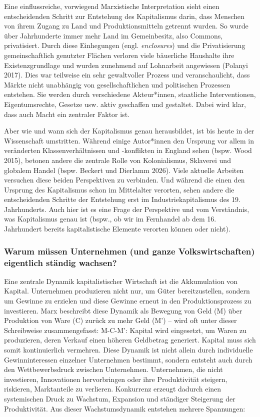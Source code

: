 \documentclass[
  nswissgerman,
  a4paper,
  DIV=11,
  numbers=noendperiod,
  oneside,
  openany]{scrreprt}
\begin{document}
Eine einflussreiche, vorwiegend Marxistische Interpretation sieht einen
entscheidenden Schritt zur Entstehung des Kapitalismus darin, dass
Menschen von ihrem Zugang zu Land und Produktionsmitteln getrennt
wurden. So wurde über Jahrhunderte immer mehr Land im Gemeinbesitz, also
Commons, privatisiert. Durch diese Einhegungen (engl. \emph{enclosures})
und die Privatisierung gemeinschaftlich genutzter Flächen verloren viele
bäuerliche Haushalte ihre Existenzgrundlage und wurden zunehmend auf
Lohnarbeit angewiesen (Polanyi 2017). Dies war teilweise ein sehr
gewaltvoller Prozess und veranschaulicht, dass Märkte nicht unabhängig
von gesellschaftlichen und politischen Prozessen entstehen. Sie werden
durch verschiedene Akteur*innen, staatliche Interventionen,
Eigentumsrechte, Gesetze usw. aktiv geschaffen und gestaltet. Dabei wird
klar, dass auch Macht ein zentraler Faktor ist.

Aber wie und wann sich der Kapitalismus genau herausbildet, ist bis
heute in der Wissenschaft umstritten. Während einige Autor*innen den
Ursprung vor allem in veränderten Klassenverhältnissen und -konflikten
in England sehen (bspw. Wood 2015), betonen andere die zentrale Rolle
von Kolonialismus, Sklaverei und globalem Handel (bspw. Beckert und
Dierlamm 2026). Viele aktuelle Arbeiten versuchen diese beiden
Perspektiven zu verbinden. Und während die einen den Ursprung des
Kapitalismus schon im Mittelalter verorten, sehen andere die
entscheidenden Schritte der Entstehung erst im Industriekapitalismus des
19. Jahrhunderts. Auch hier ist es eine Frage der Perspektive und vom
Verständnis, was Kapitalismus genau ist (bspw., ob wir im Fernhandel ab
dem 16. Jahrhundert bereits kapitalistische Elemente verorten können
oder nicht).

\subsubsection{Warum müssen Unternehmen (und ganze Volkswirtschaften)
eigentlich ständig
wachsen?}\label{warum-muxfcssen-unternehmen-und-ganze-volkswirtschaften-eigentlich-stuxe4ndig-wachsen}

Eine zentrale Dynamik kapitalistischer Wirtschaft ist die Akkumulation
von Kapital. Unternehmen produzieren nicht nur, um Güter
bereitzustellen, sondern um Gewinne zu erzielen und diese Gewinne erneut
in den Produktionsprozess zu investieren. Marx beschreibt diese Dynamik
als Bewegung von Geld (M) über Produktion von Ware (C) zurück zu mehr
Geld (M') -- wird oft unter dieser Schreibweise zusammengefasst: M-C-M':
Kapital wird eingesetzt, um Waren zu produzieren, deren Verkauf einen
höheren Geldbetrag generiert. Kapital muss sich somit kontinuierlich
vermehren. Diese Dynamik ist nicht allein durch individuelle
Gewinninteressen einzelner Unternehmen bestimmt, sondern entsteht auch
durch den Wettbewerbsdruck zwischen Unternehmen. Unternehmen, die nicht
investieren, Innovationen hervorbringen oder ihre Produktivität
steigern, riskieren, Marktanteile zu verlieren. Konkurrenz erzeugt
dadurch einen systemischen Druck zu Wachstum, Expansion und ständiger
Steigerung der Produktivität. Aus dieser Wachstumsdynamik entstehen
mehrere Spannungen:
\end{document}
